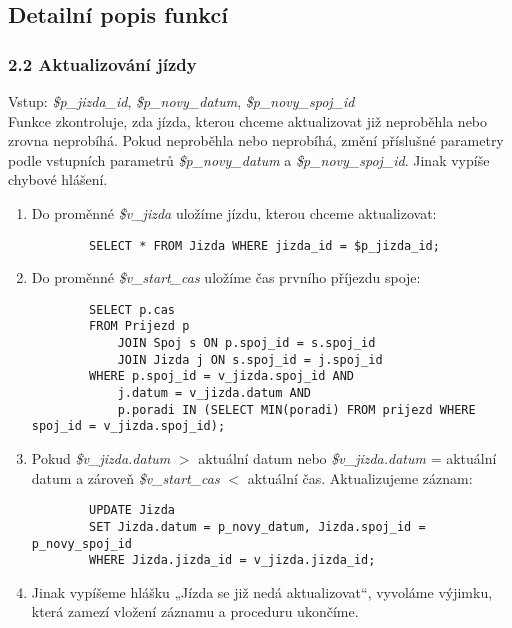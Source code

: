\documentclass[11pt]{article}
\begin{document}
\subsection{Detailní popis funkcí}


\subsubsection*{2.2 Aktualizování jízdy}
Vstup: \textit{\$p\_jizda\_id}, \textit{\$p\_novy\_datum}, \textit{\$p\_novy\_spoj\_id}\\
Funkce zkontroluje, zda jízda, kterou chceme aktualizovat již neproběhla nebo zrovna neprobíhá. Pokud neproběhla nebo neprobíhá, změní příslušné parametry podle vstupních parametrů \textit{\$p\_novy\_datum} a \textit{\$p\_novy\_spoj\_id}. Jinak vypíše chybové hlášení.

\begin{enumerate}
    \item Do proměnné \textit{\$v\_jizda} uložíme jízdu, kterou chceme aktualizovat:
    \begin{lstlisting}
        SELECT * FROM Jizda WHERE jizda_id = $p_jizda_id;
    \end{lstlisting}
    
    \item Do proměnné \textit{\$v\_start\_cas} uložíme čas prvního příjezdu spoje:
    \begin{lstlisting}
        SELECT p.cas
        FROM Prijezd p
            JOIN Spoj s ON p.spoj_id = s.spoj_id
            JOIN Jizda j ON s.spoj_id = j.spoj_id
        WHERE p.spoj_id = v_jizda.spoj_id AND
            j.datum = v_jizda.datum AND 
            p.poradi IN (SELECT MIN(poradi) FROM prijezd WHERE spoj_id = v_jizda.spoj_id);        
    \end{lstlisting}
    
    \item Pokud \textit{\$v\_jizda.datum} $>$ aktuální datum nebo \textit{\$v\_jizda.datum} = aktuální datum a zároveň \textit{\$v\_start\_cas} $<$ aktuální čas. Aktualizujeme záznam:
    \begin{lstlisting}
        UPDATE Jizda 
        SET Jizda.datum = p_novy_datum, Jizda.spoj_id = p_novy_spoj_id 
        WHERE Jizda.jizda_id = v_jizda.jizda_id;
    \end{lstlisting}

    \item Jinak vypíšeme hlášku „Jízda se již nedá aktualizovat“, vyvoláme výjimku, která zamezí vložení záznamu a proceduru ukončíme.
\end{enumerate}
\end{document}
